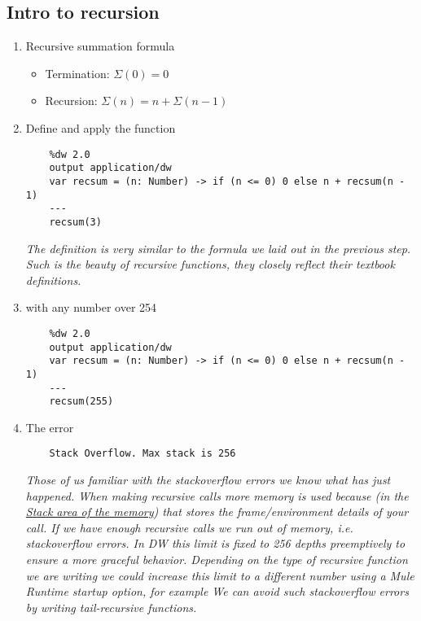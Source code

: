 \subsection{Intro to recursion}
\begin{enumerate}[resume*]
\item Recursive summation formula
  \begin{itemize}
  \item Termination: $\Sigma(0) = 0$
  \item Recursion: $\Sigma(n) = n + \Sigma(n - 1)$
  \end{itemize}
\item Define and apply the  function
  \begin{verbatim}
    %dw 2.0
    output application/dw
    var recsum = (n: Number) -> if (n <= 0) 0 else n + recsum(n - 1)
    ---
    recsum(3)
  \end{verbatim}
  \emph{
    The definition is very similar to the formula we laid out in the previous step.  Such is the beauty of recursive functions, they closely reflect their textbook definitions.
    \newline
  }
\item {} with any number over 254
  \begin{verbatim}
    %dw 2.0
    output application/dw
    var recsum = (n: Number) -> if (n <= 0) 0 else n + recsum(n - 1)
    ---
    recsum(255)
  \end{verbatim}
\item The  error
  \begin{verbatim}
    Stack Overflow. Max stack is 256
  \end{verbatim}
  \emph{
    Those of us familiar with the stackoverflow errors we know what has just happened.  When making recursive calls more memory is used because (in the \href{https://en.wikipedia.org/wiki/Stack-based_memory_allocation}{Stack area of the memory}) that stores the frame/environment details of your call.  If we have enough recursive calls we run out of memory, i.e. stackoverflow errors.
    \newline
    In DW this limit is fixed to 256 depths preemptively to ensure a more graceful behavior.  Depending on the type of recursive function we are writing we could increase this limit to a different number using a Mule Runtime startup option, for example 
    \newline We can avoid such stackoverflow errors by writing tail-recursive functions.
  }


\end{enumerate}
